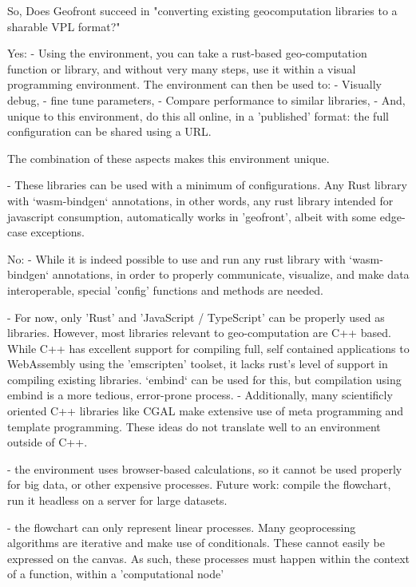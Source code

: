 \begin{note}

  So, Does Geofront succeed in "converting existing geocomputation libraries to a sharable VPL format?" 
  
  Yes: 
   - Using the environment, you can take a rust-based geo-computation function or library, 
     and without very many steps, use it within a visual programming environment. 
     The environment can then be used to:
     - Visually debug, 
     - fine tune parameters, 
     - Compare performance to similar libraries,
     - And, unique to this environment, do this all online, in a 'published' format: the full configuration can be shared using a URL. 
  
     The combination of these aspects makes this environment unique. 
  
  - These libraries can be used with a minimum of configurations. Any Rust library with `wasm-bindgen` annotations, in other words, any rust library intended for javascript consumption, automatically works in 'geofront', albeit with some edge-case exceptions. 
  
  
  No: 
   - While it is indeed possible to use and run any rust library with `wasm-bindgen` annotations, in order to properly communicate, visualize, and make data interoperable, special 'config' functions and methods are needed. 
  
   - For now, only 'Rust' and 'JavaScript / TypeScript' can be properly used as libraries. However, most libraries relevant to geo-computation are C++ based. While C++ has excellent support for compiling full, self contained applications to WebAssembly using the 'emscripten' toolset, it lacks rust's level of support in compiling existing libraries. `embind` can be used for this, but compilation using embind is a more tedious, error-prone process.   
     - Additionally, many scientificly oriented C++ libraries like CGAL make extensive use of meta programming and template programming. These ideas do not translate well to an environment outside of C++. 
  
   - the environment uses browser-based calculations, so it cannot be used properly for big data, or other expensive processes.
     Future work: compile the flowchart, run it headless on a server for large datasets.
   
   - the flowchart can only represent linear processes. Many geoprocessing algorithms are iterative and make use of conditionals. These cannot easily be expressed on the canvas. As such, these processes must happen within the context of a function, within a 'computational node'
  
  \end{note}
  
